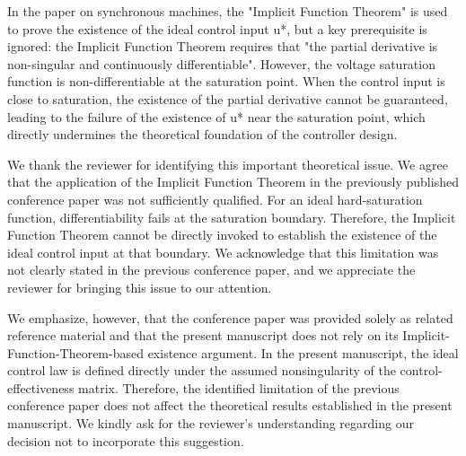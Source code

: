 \documentclass[12pt,english]{reviewresponse}
\begin{document}
% 
\begin{revcomment}[2][1]{}
	In the paper on synchronous machines, the "Implicit Function Theorem" is used to prove the existence of the ideal control input u*, but a key prerequisite is ignored: the Implicit Function Theorem requires that "the partial derivative is non-singular and continuously differentiable". However, the voltage saturation function is non-differentiable at the saturation point. When the control input is close to saturation, the existence of the partial derivative cannot be guaranteed, leading to the failure of the existence of u* near the saturation point, which directly undermines the theoretical foundation of the controller design.
\end{revcomment}

\begin{revresponse}
  We thank the reviewer for identifying this important theoretical issue. 
  We agree that the application of the Implicit Function Theorem in the previously published conference paper was not sufficiently qualified. 
  For an ideal hard-saturation function, differentiability fails at the saturation boundary. 
  Therefore, the Implicit Function Theorem cannot be directly invoked to establish the existence of the ideal control input at that boundary.
  We acknowledge that this limitation was not clearly stated in the previous conference paper, and we appreciate the reviewer for bringing this issue to our attention.

  \bigskip

  We emphasize, however, that the conference paper was provided solely as related reference material and that the present manuscript does not rely on its Implicit-Function-Theorem-based existence argument. 
  In the present manuscript, the ideal control law is defined directly under the assumed nonsingularity of the control-effectiveness matrix.  
  Therefore, the identified limitation of the previous conference paper does not affect the theoretical results established in the present manuscript.
  We kindly ask for the reviewer’s understanding regarding our decision not to incorporate this suggestion.
\end{revresponse}
\end{document}
